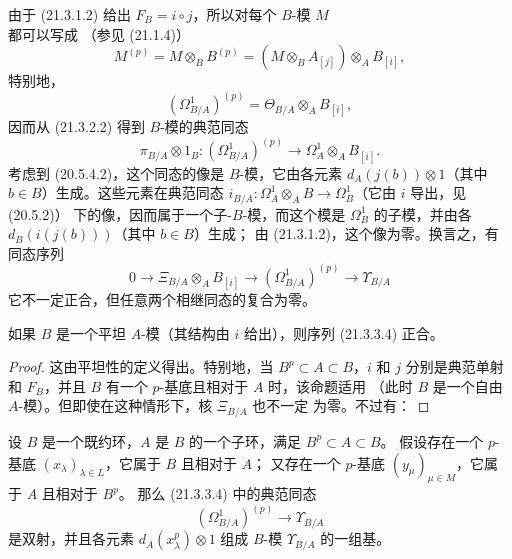 \begin{env}[21.3.3]
\label{0.21.3.3-fr}
由于 (21.3.1.2) 给出 $F_B=i\circ j$，所以对每个 $B$-模 $M$ 都可以写成
（参见 (21.1.4)）
\begin{equation}
\tag{21.3.3.1}\label{0.21.3.3.1-fr}
M^{(p)}=M\otimes_B B^{(p)}=(M\otimes_B A_{[j]})\otimes_A B_{[i]},
\end{equation}
特别地，
\begin{equation}
\tag{21.3.3.2}\label{0.21.3.3.2-fr}
(\Omega^1_{B/A})^{(p)}=\Theta_{B/A}\otimes_A B_{[i]},
\end{equation}
因而从 (21.3.2.2) 得到 $B$-模的典范同态
\begin{equation}
\tag{21.3.3.3}\label{0.21.3.3.3-fr}
\pi_{B/A}\otimes1_B:(\Omega^1_{B/A})^{(p)}\longrightarrow
\Omega^1_A\otimes_A B_{[i]}.
\end{equation}
考虑到 (20.5.4.2)，这个同态的像是 $B$-模，它由各元素
$d_A(j(b))\otimes1$（其中 $b\in B$）生成。这些元素在典范同态
$i_{B/A}:\Omega^1_A\otimes_A B\to\Omega^1_B$（它由 $i$ 导出，见 (20.5.2)）
下的像，因而属于一个子-$B$-模，而这个模是 $\Omega^1_B$ 的子模，并由各
$d_B(i(j(b)))$（其中 $b\in B$）生成；
由 (21.3.1.2)，这个像为零。换言之，有同态序列
\begin{equation}
\tag{21.3.3.4}\label{0.21.3.3.4-fr}
0\to\Xi_{B/A}\otimes_A B_{[i]}\to(\Omega^1_{B/A})^{(p)}
\to\Upsilon_{B/A}
\end{equation}
它不一定正合，但任意两个相继同态的复合为零。
\end{env}

\begin{proposition}[21.3.4]
\label{0.21.3.4-fr}
如果 $B$ 是一个平坦 $A$-模（其结构由 $i$ 给出），则序列 (21.3.3.4) 正合。
\end{proposition}
\begin{proof}
这由平坦性的定义得出。特别地，当 $B^p\subset A\subset B$，$i$ 和 $j$
分别是典范单射和 $F_B$，并且 $B$ 有一个 $p$-基底且相对于 $A$ 时，该命题适用
（此时 $B$ 是一个自由 $A$-模）。但即使在这种情形下，核 $\Xi_{B/A}$ 也不一定
为零。不过有：
\end{proof}

\begin{proposition}[21.3.5]
\label{0.21.3.5-fr}
设 $B$ 是一个既约环，$A$ 是 $B$ 的一个子环，满足 $B^p\subset A\subset B$。
假设存在一个 $p$-基底 $(x_\lambda)_{\lambda\in L}$，它属于 $B$ 且相对于 $A$；
又存在一个 $p$-基底 $(y_\mu)_{\mu\in M}$，它属于 $A$ 且相对于 $B^p$。
那么 (21.3.3.4) 中的典范同态
\begin{equation}
\tag{21.3.5.1}\label{0.21.3.5.1-fr}
(\Omega^1_{B/A})^{(p)}\longrightarrow\Upsilon_{B/A}
\end{equation}
是双射，并且各元素 $d_A(x_\lambda^p)\otimes1$ 组成 $B$-模
$\Upsilon_{B/A}$ 的一组基。
\end{proposition}

